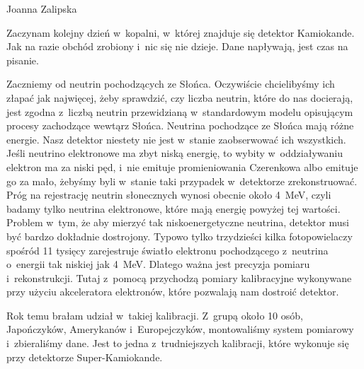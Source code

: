 

{Joanna Zalipska}


Zaczynam kolejny dzień w~kopalni, w~której znajduje się detektor Kamiokande. Jak na razie obchód zrobiony i~nic się nie dzieje. Dane napływają, jest czas na pisanie. 


Zaczniemy od neutrin pochodzących ze Słońca. Oczywiście chcielibyśmy ich złapać jak najwięcej, żeby sprawdzić, czy
liczba neutrin, które do nas docierają, jest zgodna z~liczbą neutrin przewidzianą w~standardowym modelu
opisującym procesy zachodzące wewtąrz Słońca. 
Neutrina
pochodzące ze Słońca
mają różne energie. Nasz detektor niestety nie jest w~stanie zaobserwować ich wszystkich. Jeśli neutrino elektronowe ma zbyt niską energię, to wybity w~oddziaływaniu elektron ma za niski pęd, i~nie emituje promieniowania Czerenkowa albo emituje go za mało, żebyśmy byli w~stanie taki przypadek w~detektorze zrekonstruować. Próg na rejestrację neutrin słonecznych wynosi obecnie około 4~MeV, czyli badamy tylko neutrina elektronowe, które mają energię powyżej tej wartości. 
Problem w~tym, że aby mierzyć tak niskoenergetyczne neutrina, detektor musi być bardzo dokładnie dostrojony. Typowo tylko trzydzieści kilka fotopowielaczy spośród 11 tysięcy zarejestruje światło elektronu pochodzącego z~neutrina o~energii tak niskiej jak 4~MeV. Dlatego ważna jest precyzja pomiaru i~rekonstrukcji.
Tutaj z~pomocą przychodzą pomiary kalibracyjne wykonywane przy użyciu akceleratora elektronów, które pozwalają nam dostroić detektor.


Rok temu brałam udział w~takiej kalibracji. Z~grupą około 10 osób, Japończyków, Amerykanów i~Europejczyków, montowaliśmy system pomiarowy i~zbieraliśmy dane. Jest to jedna z~trudniejszych kalibracji, które wykonuje się przy detektorze Super-Kamiokande.


